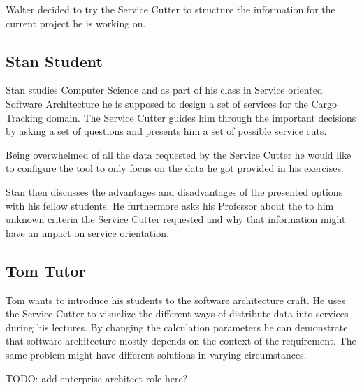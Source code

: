 Walter decided to try the Service Cutter to structure the information for the current project he is working on.


\subsection{Stan Student}

Stan studies Computer Science and as part of his class in Service oriented Software Architecture he is supposed to design a set of services for the Cargo Tracking\cite{dddGithub} domain. The Service Cutter guides him through the important decisions by asking a set of questions and presents him a set of possible service cuts. 

Being overwhelmed of all the data requested by the Service Cutter he would like to configure the tool to only focus on the data he got provided in his exercises. 

Stan then discusses the advantages and disadvantages of the presented options with his fellow students. He furthermore asks his Professor about the to him unknown criteria the Service Cutter requested and why that information might have an impact on service orientation. 


\subsection{Tom Tutor}

Tom wants to introduce his students to the software architecture craft. He uses the Service Cutter to visualize the different ways of distribute data into services during his lectures. By changing the calculation parameters he can demonstrate that software architecture mostly depends on the context of the requirement. The same problem might have different solutions in varying circumstances.

TODO: add enterprise architect role here?
